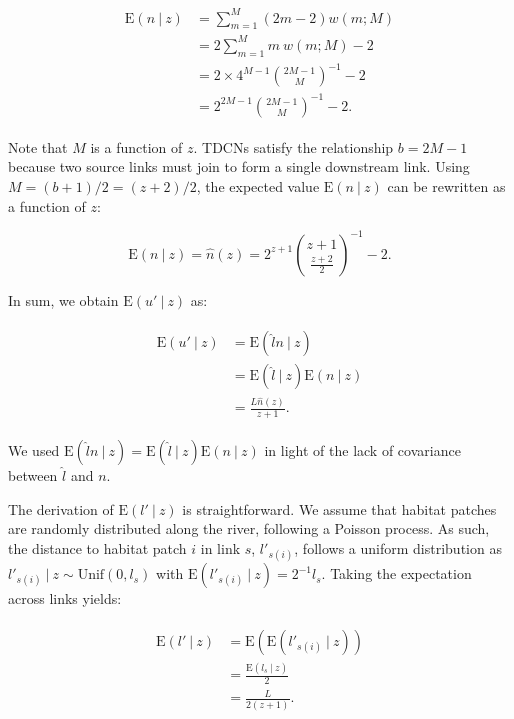 \documentclass[11pt, class=article, crop=false]{standalone}
\begin{document}
\begin{align}
    \begin{split}
    \mbox{E}(n~|~z) &= \sum_{m=1}^{M} (2m - 2) w(m; M)\\
                    &= 2 \sum_{m=1}^{M} m~w(m; M) - 2\\
                    &= 2 \times 4^{M-1} \binom{2M-1}{M}^{-1} - 2\\
                    &= 2^{2M-1} \binom{2M-1}{M}^{-1} - 2.
    \end{split}
    \label{eq:n-hat}
\end{align}

Note that $M$ is a function of $z$.
TDCNs satisfy the relationship $b = 2M - 1$ because two source links must join to form a single downstream link.
Using $M = (b + 1) / 2 = (z + 2) / 2$, the expected value $\mbox{E}(n~|~z)$ can be rewritten as a function of $z$:

\begin{equation}
    \mbox{E}(n~|~z) = \hat{n}(z) = 
    2^{z + 1} \binom{z + 1}{\frac{z + 2}{2}}^{-1} - 2.
\end{equation}

In sum, we obtain $\mbox{E}(u' ~|~ z)$ as:

\begin{align}
    \begin{split}
        \mbox{E}(u' ~|~ z) &= \mbox{E}(\hat{l}n ~|~ z)\\
                           &= \mbox{E}(\hat{l} ~|~ z)\mbox{E}(n ~|~ z)\\
                           &= \frac{L \hat{n}(z)}{z + 1}.
    \end{split}
\end{align}

We used $\mbox{E}(\hat{l}n ~|~ z) = \mbox{E}(\hat{l} ~|~ z)\mbox{E}(n ~|~ z)$ in light of the lack of covariance between $\hat{l}$ and $n$.

The derivation of $\mbox{E}(l'~|~z)$ is straightforward.
We assume that habitat patches are randomly distributed along the river, following a Poisson process.
As such, the distance to habitat patch $i$ in link $s$, $l'_{s(i)}$, follows a uniform distribution as $l'_{s(i)}~|~z \sim \mbox{Unif}(0, l_s)$ with $\mbox{E}(l'_{s(i)}~|~z) = 2^{-1} l_s$.
Taking the expectation across links yields:

\begin{align}
    \begin{split}
        \mbox{E}(l'~|~z) &= \mbox{E}(\mbox{E}(l'_{s(i)}~|~z))\\
                     &= \frac{\mbox{E}(l_s~|~z)}{2}\\
                     &= \frac{L}{2(z + 1)}.
    \end{split}
\end{align}
\end{document}

